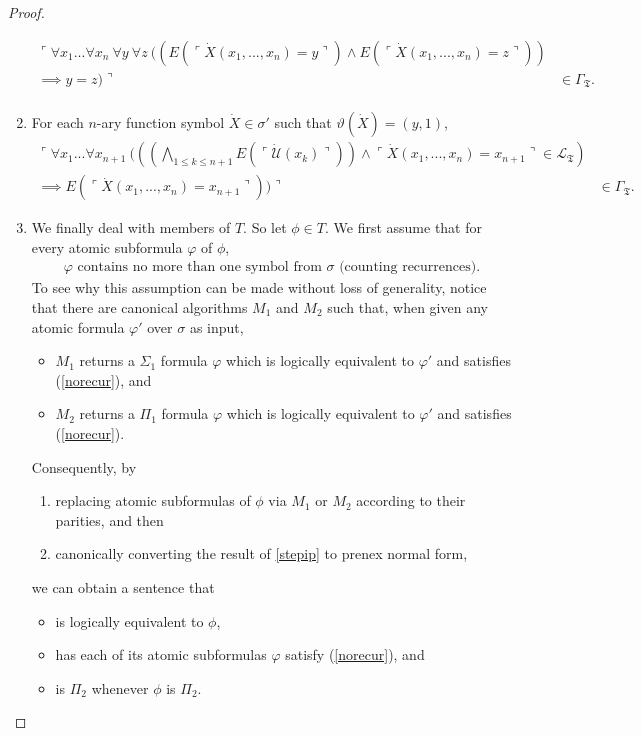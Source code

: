 \documentclass[12pt]{article}
\numberwithin{equation}{section}
\begin{document}
\begin{proof}
\begin{enumerate}[label=(\arabic*)]
\begin{align*}
        \ulcorner \forall x_1 ... \forall x_n \ \forall y \ \forall z \ ((E(\ulcorner \dot{X} (x_1, ..., x_n) = y \urcorner) \wedge E(\ulcorner \dot{X} (x_1, ..., x_n) = z \urcorner)) & \\ 
        \implies y = z) \urcorner & \in \Gamma_{\mathfrak{T}}. \\
    \end{align*}
    \item\label{gamma5} For each $n$-ary function symbol $\dot{X} \in \sigma'$ such that $\vartheta(\dot{X}) = (y, 1)$, 
    \begin{align*}
        \ulcorner \forall x_1 ... \forall x_{n+1} \ (((\bigwedge_{1 \leq k \leq n+1} E(\ulcorner \dot{\mathcal{U}}(x_k) \urcorner)) \wedge \ulcorner \dot{X}(x_1, ..., x_n) = x_{n+1} \urcorner \in \mathcal{L}_{\mathfrak{T}}) & \\
        \implies E(\ulcorner \dot{X}(x_1, ..., x_n) = x_{n+1} \urcorner)) \urcorner & \in \Gamma_{\mathfrak{T}}.
    \end{align*}
    \item\label{gamma6} We finally deal with members of $T$. So let $\phi \in T$. We first assume that for every atomic subformula $\varphi$ of $\phi$, 
    \begin{align}\label{norecur}
        \varphi \text{ contains no more than one symbol from } \sigma \text{ (counting recurrences).} 
    \end{align} 
    To see why this assumption can be made without loss of generality, notice that there are canonical algorithms $M_1$ and $M_2$ such that, when given any atomic formula $\varphi'$ over $\sigma$ as input,
    \begin{itemize}
        \item $M_1$ returns a $\Sigma_1$ formula $\varphi$ which is logically equivalent to $\varphi'$ and satisfies (\ref{norecur}), and
        \item $M_2$ returns a $\Pi_1$ formula $\varphi$ which is logically equivalent to $\varphi'$ and satisfies (\ref{norecur}).
    \end{itemize}
    Consequently, by 
    \begin{enumerate}[label=(\roman*)]
        \item\label{stepip} replacing atomic subformulas of $\phi$ via $M_1$ or $M_2$ according to their parities, and then
        \item canonically converting the result of \ref{stepip} to prenex normal form,
    \end{enumerate}
    we can obtain a sentence that
    \begin{itemize}
        \item is logically equivalent to $\phi$,
        \item has each of its atomic subformulas $\varphi$ satisfy (\ref{norecur}), and
        \item is $\Pi_2$ whenever $\phi$ is $\Pi_2$.
    \end{itemize}
    

\end{enumerate}
\end{proof}
\end{document}
